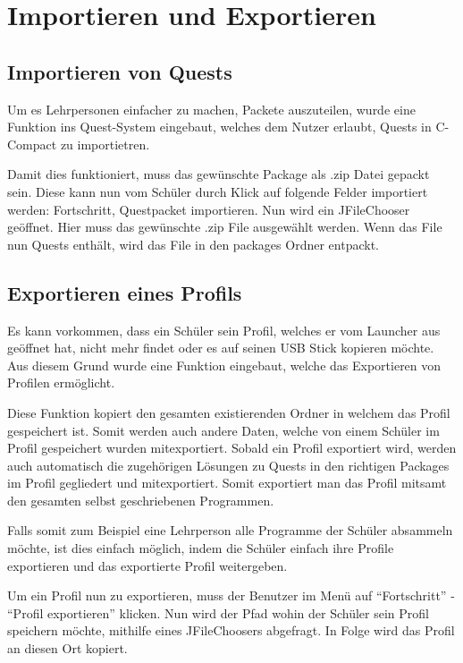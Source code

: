 \section{Importieren und Exportieren}
\subsection{Importieren von Quests}
Um es Lehrpersonen einfacher zu machen, Packete auszuteilen, wurde eine Funktion ins Quest-System eingebaut, welches dem Nutzer erlaubt, Quests in C-Compact zu importietren.

Damit dies funktioniert, muss das gewünschte Package als .zip Datei gepackt sein. Diese kann nun vom Schüler durch Klick auf folgende Felder importiert werden: Fortschritt, Questpacket importieren. Nun wird ein JFileChooser geöffnet. Hier muss das gewünschte .zip File ausgewählt werden. Wenn das File nun Quests enthält, wird das File in den packages Ordner entpackt.

\subsection{Exportieren eines Profils}
Es kann vorkommen, dass ein Schüler sein Profil, welches er vom Launcher aus geöffnet hat, nicht mehr findet oder es auf seinen USB Stick kopieren möchte. Aus diesem Grund wurde eine Funktion eingebaut, welche das Exportieren von Profilen ermöglicht.

Diese Funktion kopiert den gesamten existierenden Ordner in welchem das Profil gespeichert ist. Somit werden auch andere Daten, welche von einem Schüler im Profil gespeichert wurden mitexportiert. Sobald ein Profil exportiert wird, werden auch automatisch die zugehörigen Lösungen zu Quests in den richtigen Packages im Profil gegliedert und mitexportiert. Somit exportiert man das Profil mitsamt den gesamten selbst geschriebenen Programmen.

Falls somit zum Beispiel eine Lehrperson alle Programme der Schüler absammeln möchte, ist dies einfach möglich, indem die Schüler einfach ihre Profile exportieren und das exportierte Profil weitergeben.

Um ein Profil nun zu exportieren, muss der Benutzer im Menü auf "`Fortschritt"' - "`Profil exportieren"' klicken. Nun wird der Pfad wohin der Schüler sein Profil speichern möchte, mithilfe eines JFileChoosers abgefragt. In Folge wird das Profil an diesen Ort kopiert.